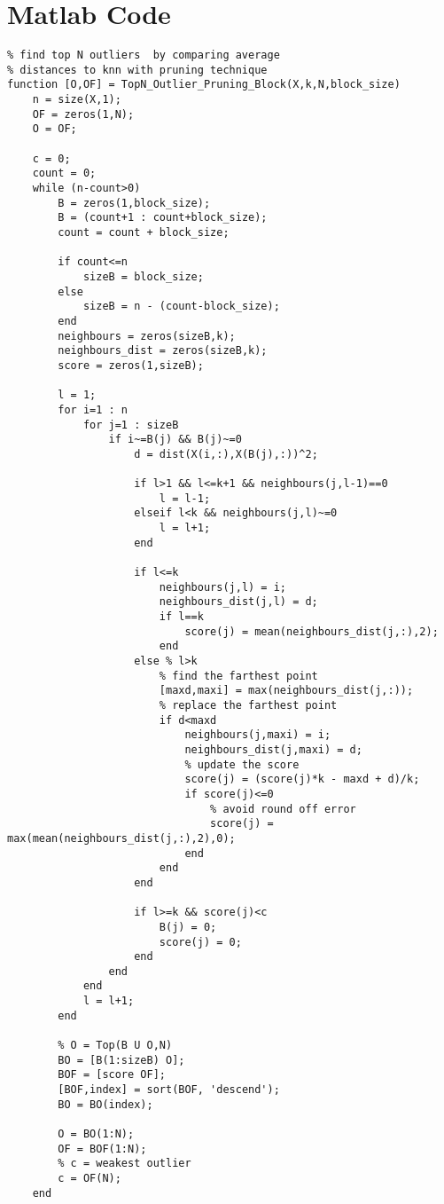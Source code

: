 \appendix

\chapter{Matlab Code}
\label{apdx:matlabCode}
\lstset{language=Matlab}
\begin{lstlisting}
% find top N outliers  by comparing average 
% distances to knn with pruning technique
function [O,OF] = TopN_Outlier_Pruning_Block(X,k,N,block_size)
	n = size(X,1);
	OF = zeros(1,N);
	O = OF;

	c = 0;
	count = 0;
	while (n-count>0)
		B = zeros(1,block_size);
		B = (count+1 : count+block_size);
		count = count + block_size;        
		
		if count<=n
			sizeB = block_size;
		else
			sizeB = n - (count-block_size);
		end
		neighbours = zeros(sizeB,k);
		neighbours_dist = zeros(sizeB,k);
		score = zeros(1,sizeB);

		l = 1;
		for i=1 : n
			for j=1 : sizeB
				if i~=B(j) && B(j)~=0
					d = dist(X(i,:),X(B(j),:))^2;
		            
					if l>1 && l<=k+1 && neighbours(j,l-1)==0
						l = l-1;
					elseif l<k && neighbours(j,l)~=0
						l = l+1;
					end
		            
					if l<=k 
						neighbours(j,l) = i;   
						neighbours_dist(j,l) = d;
						if l==k
							score(j) = mean(neighbours_dist(j,:),2);
						end
					else % l>k
						% find the farthest point
						[maxd,maxi] = max(neighbours_dist(j,:));
						% replace the farthest point
						if d<maxd 
							neighbours(j,maxi) = i;
							neighbours_dist(j,maxi) = d;
							% update the score
							score(j) = (score(j)*k - maxd + d)/k;
							if score(j)<=0
								% avoid round off error
								score(j) = max(mean(neighbours_dist(j,:),2),0);
							end
						end                    
					end
		            
					if l>=k && score(j)<c
						B(j) = 0;                    
						score(j) = 0;                   
					end                                            
				end
			end
			l = l+1;
		end
		
		% O = Top(B U O,N)
		BO = [B(1:sizeB) O];
		BOF = [score OF];
		[BOF,index] = sort(BOF, 'descend');
		BO = BO(index);
		
		O = BO(1:N);
		OF = BOF(1:N);    
		% c = weakest outlier
		c = OF(N);
	end
\end{lstlisting}

